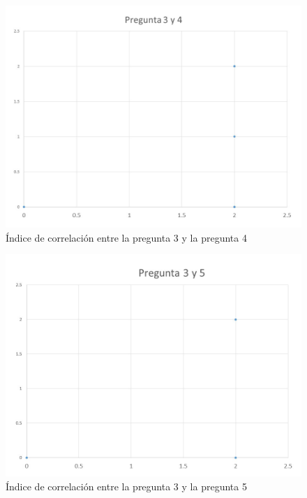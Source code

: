 \documentclass[12pt] {report}
\begin{document}
\begin{figure}[H]
\centering 
\includegraphics[scale=.4]{MCorrelacionmin34.JPG}
\caption{Índice de correlación entre la pregunta 3 y la pregunta 4}
\end{figure}

\begin{figure}[H]
\centering 
\includegraphics[scale=.4]{MCorrelacionmin35.JPG}
\caption{Índice de correlación entre la pregunta 3 y la pregunta 5}
\end{figure}
\end{document}
